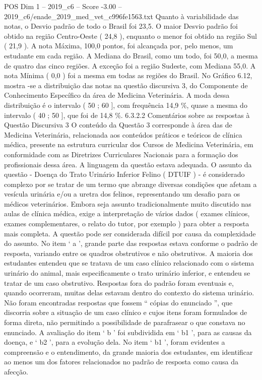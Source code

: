 \begin{textsample}{POS Dim 1 – 2019\_c6 – Score -3.00 – 2019\_c6/enade\_2019\_med\_vet\_c996fe1563.txt}
Quanto à variabilidade das notas, o Desvio padrão de todo o Brasil foi 23,5.
O maior Desvio padrão foi obtido na região Centro-Oeste ( 24,8 ), enquanto o menor foi obtido na região Sul ( 21,9 ).
A nota Máxima, 100,0 pontos, foi alcançada por, pelo menos, um estudante em cada região.
A Mediana do Brasil, como um todo, foi 50,0, a mesma de quatro das cinco regiões.
A exceção foi a região Sudeste, com Mediana 55,0.
A nota Mínima ( 0,0 ) foi a mesma em todas as regiões do Brasil.
No Gráfico 6.12, mostra -se a distribuição das notas na questão discursiva 3, do Componente de Conhecimento Específico da área de Medicina Veterinária.
A moda dessa distribuição é o intervalo ( 50 ; 60 ], com frequência 14,9 \%, quase a mesma do intervalo ( 40 ; 50 ], que foi de 14,8 \%. 6.3.2.2 Comentários sobre as respostas à Questão Discursiva 3 O conteúdo da Questão 3 corresponde à área das de Medicina Veterinária, relacionada aos conteúdos práticos e teóricos de clínica médica, presente na estrutura curricular dos Cursos de Medicina Veterinária, em conformidade com as Diretrizes Curriculares Nacionais para a formação dos profissionais dessa área.
A linguagem da questão estava adequada.
O assunto da questão - Doença do Trato Urinário Inferior Felino ( DTUIF ) - é considerado complexo por se tratar de um termo que abrange diversas condições que afetam a vesícula urinária e/ou a uretra dos felinos, representando um desafio para os médicos veterinários.
Embora seja assunto tradicionalmente muito discutido nas aulas de clínica médica, exige a interpretação de vários dados ( exames clínicos, exames complementares, o relato do tutor, por exemplo ) para obter a resposta mais completa.
A questão pode ser considerada difícil por causa da complexidade do assunto.
No item ‘ a ’, grande parte das respostas estava conforme o padrão de resposta, variando entre os quadros obstrutivos e não obstrutivos.
A maioria dos estudantes entendeu que se tratava de um caso clínico relacionado com o sistema urinário do animal, mais especificamente o trato urinário inferior, e entendeu se tratar de um caso obstrutivo.
Respostas fora do padrão foram eventuais e, quando ocorreram, muitas delas estavam dentro do contexto do sistema urinário.
Não foram encontradas respostas que fossem “ cópias do enunciado ”, que discorria sobre a situação de um caso clínico e cujos itens foram formulados de forma direta, não permitindo a possibilidade de parafrasear o que constava no enunciado.
A avaliação do item ‘ b ’ foi subdividida em ‘ b1 ’, para as causas da doença, e ‘ b2 ’, para a evolução dela.
No item ‘ b1 ’, foram evidentes a compreensão e o entendimento, da grande maioria dos estudantes, em identificar ao menos um dos fatores relacionados no padrão de resposta como causa da afecção.

\end{textsample}
